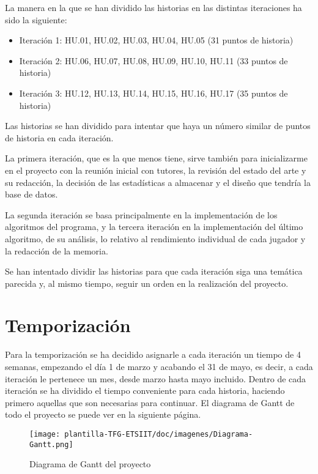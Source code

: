 La manera en la que se han dividido las historias en las distintas iteraciones ha sido la siguiente:
\begin{itemize}
    \item Iteración 1: HU.01, HU.02, HU.03, HU.04, HU.05 (31 puntos de historia)
    \item Iteración 2: HU.06, HU.07, HU.08, HU.09, HU.10, HU.11 (33 puntos de historia)
    \item Iteración 3: HU.12, HU.13, HU.14, HU.15, HU.16, HU.17 (35 puntos de historia)
    
\end{itemize}

Las historias se han dividido para intentar que haya un número similar de puntos de historia en cada iteración. 

La primera iteración, que es la que menos tiene, sirve también para inicializarme en el proyecto con la reunión inicial con tutores, la revisión del estado del  arte y su redacción, la decisión de las estadísticas a almacenar y el diseño que tendría la base de datos.

La segunda iteración se basa principalmente en la implementación de los algoritmos del programa, y la tercera iteración en la implementación del último algoritmo, de su análisis, lo relativo al rendimiento individual de cada jugador y la redacción de la memoria.

Se han intentado dividir las historias para que cada iteración siga una temática parecida y, al mismo tiempo, seguir un orden en la realización del proyecto.

\section{Temporización}
Para la temporización se ha decidido asignarle a cada iteración un tiempo de 4 semanas, empezando el día 1 de marzo y acabando el 31 de mayo, es decir, a cada iteración le pertenece un mes, desde marzo hasta mayo incluido. Dentro de cada iteración se ha dividido el tiempo conveniente para cada historia, haciendo primero aquellas que son necesarias para continuar. El diagrama de Gantt de todo el proyecto se puede ver en la siguiente página.

\begin{figure}[p]
    \centering
    \begin{sideways}
        \texttt{[image: plantilla-TFG-ETSIIT/doc/imagenes/Diagrama-Gantt.png]}
    \end{sideways}
    \caption{Diagrama de Gantt del proyecto}
    \label{fig:imagen-ajustada}
\end{figure}

